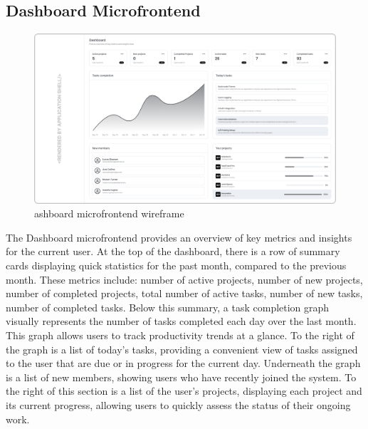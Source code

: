 \subsection{Dashboard Microfrontend}
\begin{figure}[h]
\centerline{\includegraphics[width=1\textwidth]{images/wireframes/dashboard.png}}
\caption[Dashboard microfrontend wireframe]{ashboard microfrontend wireframe}
\label{mf:dashboard}
\end{figure}
The Dashboard microfrontend provides an overview of key metrics and insights for the current user. At the top of the dashboard, there is a row of summary cards displaying quick statistics for the past month, compared to the previous month. These metrics include: number of active projects, number of new projects, number of completed projects, total number of active tasks, number of new tasks, number of completed tasks. Below this summary, a task completion graph visually represents the number of tasks completed each day over the last month. This graph allows users to track productivity trends at a glance. To the right of the graph is a list of today's tasks, providing a convenient view of tasks assigned to the user that are due or in progress for the current day. Underneath the graph is a list of new members, showing users who have recently joined the system. To the right of this section is a list of the user's projects, displaying each project and its current progress, allowing users to quickly assess the status of their ongoing work.